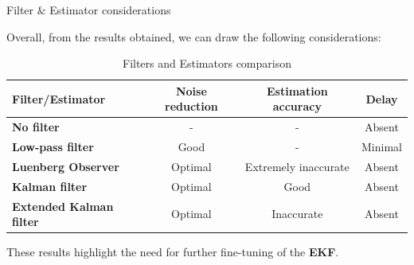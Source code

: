 \begin{frame}{Filter \& Estimator considerations}

    Overall, from the results obtained, we can draw the following considerations:

    \begin{table}[H]
        \centering

        \begin{tabular}{|l|c|c|c|}
            \hline
            \textbf{Filter/Estimator}       & \textbf{Noise reduction} & \textbf{Estimation accuracy} & \textbf{Delay} \\ \hline
            \textbf{No filter}              & -                        & -                            & Absent         \\ \hline
            \textbf{Low-pass filter}        & Good                     & -                            & Minimal        \\ \hline
            \textbf{Luenberg Observer}      & Optimal                  & Extremely inaccurate         & Absent         \\ \hline
            \textbf{Kalman filter}          & Optimal                  & Good                         & Absent         \\ \hline
            \textbf{Extended Kalman filter} & Optimal                  & Inaccurate                   & Absent         \\ \hline
        \end{tabular}
        \caption{Filters and Estimators comparison}
    \end{table}

    \vspace{9pt}

    These results highlight the need for further fine-tuning of the \textbf{EKF}.

\end{frame}